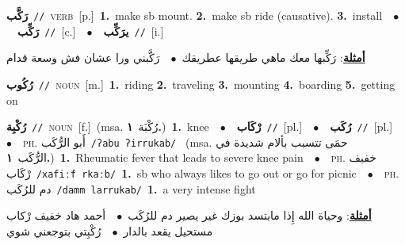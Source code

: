 \documentclass[10pt,a4paper,twoside]{article} %
\begin{document}
\begin{multicols}{2}
{\setlength\topsep{0pt}\textbf{\foreignlanguage{arabic}{رَكَّب}}\ {\color{gray}\texttt{//}\color{black}}\ \textsc{verb}\ [p.]\ \textbf{1.}~make sb mount.  \textbf{2.}~make sb ride (causative).  \textbf{3.}~install\ \ $\bullet$\ \ \setlength\topsep{0pt}\textbf{\foreignlanguage{arabic}{رَكِّب}}\ {\color{gray}\texttt{//}\color{black}}\ [c.]\ \ $\bullet$\ \ \setlength\topsep{0pt}\textbf{\foreignlanguage{arabic}{يرَكِّب}}\ {\color{gray}\texttt{//}\color{black}}\ [i.]\  \begin{flushright}\color{gray}\foreignlanguage{arabic}{\textbf{\underline{\foreignlanguage{arabic}{أمثلة}}}: رَكِّبها معك ماهي طريقها عطريقك\ $\bullet$\ \  رَكَّبني ورا عشان فش وسعة قدام}\end{flushright}\color{black}} \vspace{2mm}

{\setlength\topsep{0pt}\textbf{\foreignlanguage{arabic}{رُكُوب}}\ {\color{gray}\texttt{//}\color{black}}\ \textsc{noun}\ [m.]\ \textbf{1.}~riding  \textbf{2.}~traveling  \textbf{3.}~mounting  \textbf{4.}~boarding  \textbf{5.}~getting on\ } \vspace{2mm}

{\setlength\topsep{0pt}\textbf{\foreignlanguage{arabic}{رُكْبِة}}\ {\color{gray}\texttt{//}\color{black}}\ \textsc{noun}\ [f.]\ \color{gray}(msa. \foreignlanguage{arabic}{رُكْبَة}~\foreignlanguage{arabic}{\textbf{١.}})\color{black}\ \textbf{1.}~knee\ \ $\bullet$\ \ \setlength\topsep{0pt}\textbf{\foreignlanguage{arabic}{رْكَاب}}\ {\color{gray}\texttt{//}\color{black}}\ [pl.]\ \ $\bullet$\ \ \setlength\topsep{0pt}\textbf{\foreignlanguage{arabic}{رُكَب}}\ {\color{gray}\texttt{//}\color{black}}\ [pl.]\ \ $\bullet$\ \ \textsc{ph.} \color{gray} \foreignlanguage{arabic}{أَبو الرُّكَب}\color{black}\ {\color{gray}\texttt{/{\sffamily ʔabu ʔirrukab}/}\color{black}}\ \color{gray} (msa. \foreignlanguage{arabic}{حمَى تتسبب بألام شديدة في الرُّكَب}~\foreignlanguage{arabic}{\textbf{١.}})\color{black}\ \textbf{1.}~Rheumatic fever that leads to severe knee pain\ \ $\bullet$\ \ \textsc{ph.} \color{gray} \foreignlanguage{arabic}{خفيف رْكَاب}\color{black}\ {\color{gray}\texttt{/{\sffamily xafiːf rkaːb}/}\color{black}}\ \textbf{1.}~sb who always likes to go out or go for picnic\ \ $\bullet$\ \ \textsc{ph.} \color{gray} \foreignlanguage{arabic}{دم للرُكَب}\color{black}\ {\color{gray}\texttt{/{\sffamily damm larrukab}/}\color{black}}\ \textbf{1.}~a very intense fight\  \begin{flushright}\color{gray}\foreignlanguage{arabic}{\textbf{\underline{\foreignlanguage{arabic}{أمثلة}}}: وحياة الله إِذا مابتسد بوزك غير يصير دم للرُكَب\ $\bullet$\ \  أحمد هاد خفيف رْكاب مستحيل يقعد بالدار\ $\bullet$\ \  رُكْبِتي بتوجعني شوي}\end{flushright}\color{black}} \vspace{2mm}


\end{multicols}
\end{document}
